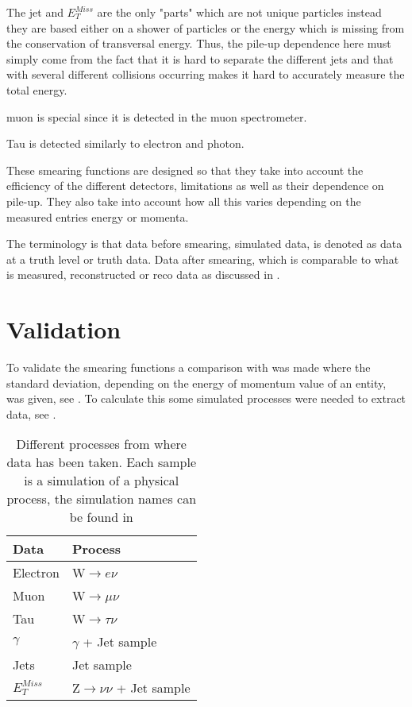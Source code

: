 The jet and $E^{Miss}_T$ are the only "parts" which are not unique particles instead they are based either on a shower of particles or the energy which is missing from the conservation of transversal energy. Thus, the pile-up dependence here must simply come from the fact that it is hard to separate the different jets and that with several different collisions occurring makes it hard to accurately measure the total energy.

muon is special since it is detected in the muon spectrometer.  

Tau is detected similarly to electron and photon.

These smearing functions are designed so that they take into account the efficiency of the different detectors, limitations as well as their dependence on pile-up. They also take into account how all this varies depending on the measured entries energy or momenta.

The terminology is that data before smearing, simulated data, is denoted as data at a truth level or truth data. Data after smearing, which is comparable to what is measured, reconstructed or reco data as discussed in .
\newpage
\section{Validation}\label{sec:vali}
To validate the smearing functions a comparison with \citep{ATL-PHYS-PUB-2013-004} was made where the standard deviation, depending on the energy of momentum value of an entity, was given, see . To calculate this some simulated processes were needed to extract data, see . 
\begin{SCtable}[][ht]
\begin{tabular}{|l|l|}
\hline
Data & Process \\ \hline
Electron & W$\rightarrow e\nu$ \\
Muon & W$\rightarrow \mu \nu$ \\
Tau & W$\rightarrow \tau \nu$ \\
$\gamma$ & $\gamma$ + Jet sample \\
Jets & Jet sample \\
$E_T^{Miss}$ & Z$\rightarrow \nu \nu$ + Jet sample \\ \hline
\end{tabular}
\caption{Different processes from where data has been taken. Each sample is a simulation of a physical process, the simulation names can be found in }
\label{tab:backproc}
\end{SCtable}

